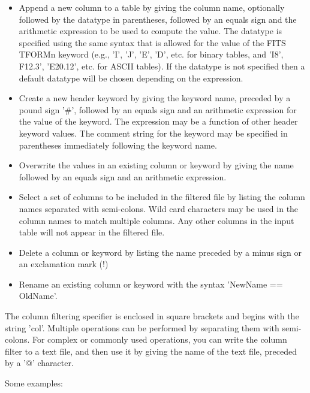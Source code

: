 \documentclass[11pt]{article}
\begin{document}
\begin{itemize}
\item
Append a new column to a table by giving the column name, optionally
followed by the datatype in parentheses, followed by an equals sign and
the arithmetic  expression to be used to compute the value.  The
datatype is specified using the same syntax that is allowed for the
value of the FITS TFORMn keyword (e.g., 'I', 'J', 'E', 'D', etc. for
binary tables, and 'I8', F12.3', 'E20.12', etc.  for ASCII tables).  If
the datatype is not specified then a default datatype will be chosen
depending on the expression.

\item
Create a new header keyword by giving the keyword name, preceded by a
pound sign '\#', followed by an equals sign and an arithmetic
expression for the value of the keyword.  The expression may be a
function of other header keyword values.  The comment string for the
keyword may be specified in parentheses immediately following the
keyword name.

\item
Overwrite the values in an existing column or keyword by giving the
name followed by an equals sign and an arithmetic expression.

\item
Select a set of columns to be included in the filtered file by listing
the column names separated with semi-colons.   Wild card characters may
be used in the column names to match multiple columns.  Any other
columns in the input table will not appear in the filtered file.

\item
Delete a column or keyword by listing the name preceded by a minus sign
or an exclamation mark (!)

\item
Rename an existing column or keyword with the syntax 'NewName ==
OldName'.

\end{itemize}

The column filtering specifier is enclosed in square brackets and
begins with the string 'col'.   Multiple operations can be performed
by separating them with semi-colons.  For  complex  or commonly used
operations,  you can write the column filter to a text file, and then
use it by giving the name of the text file, preceded by a '@'
character.

Some examples:
\end{document}
